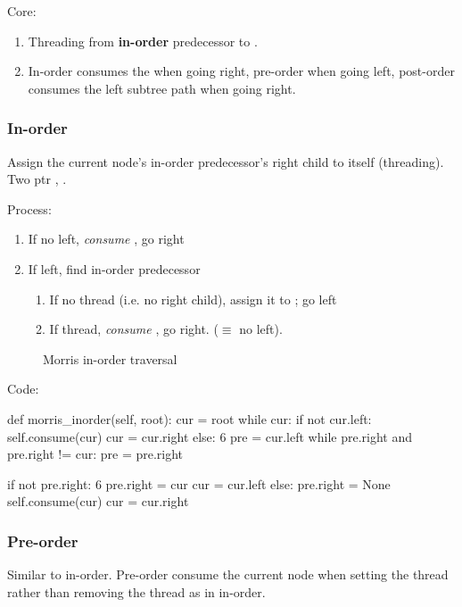 Core:
\begin{enumerate}
\item Threading from \textbf{in-order} predecessor to .
\item In-order consumes the  when going right, pre-order when going left, post-order consumes the left subtree path when going right. 
\end{enumerate}
\subsubsection{In-order}
Assign the current node's in-order predecessor's right child to itself (threading). Two ptr , . 

Process:
\begin{enumerate}
\item If no left, \textit{consume} , go right 
\item If left, find in-order predecessor 
\begin{enumerate}
\item If no thread (i.e. no  right child), assign it to ; go left
\item If thread, \textit{consume} , go right. ($\equiv$ no left). 
\end{enumerate}
\end{enumerate}

\begin{figure*}[!htb]
\centering
{}
\caption{Morris in-order traversal}
\label{fig:morrisInorder}
\end{figure*}
\newpage
Code:
\begin{python}
def morris_inorder(self, root):
    cur = root
    while cur:
        if not cur.left:
            self.consume(cur)
            cur = cur.right
        else:  6
            pre = cur.left
            while pre.right and pre.right != cur:
                pre = pre.right

            if not pre.right:
                 6  pre.right = cur
                cur = cur.left
            else:
                pre.right = None
                self.consume(cur)
                cur = cur.right
\end{python}
\subsubsection{Pre-order}
Similar to in-order. Pre-order consume the current node when setting the thread rather than removing the thread as in in-order.

